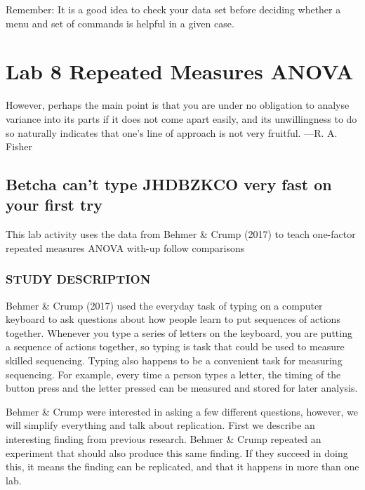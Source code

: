 \documentclass[
]{book}
\begin{document}
Remember: It is a good idea to check your data set before deciding whether a menu and set of commands is helpful in a given case.

\hypertarget{lab-8-repeated-measures-anova}{%
\chapter{Lab 8 Repeated Measures ANOVA}\label{lab-8-repeated-measures-anova}}

{
However, perhaps the main point is that you are under no obligation to analyse variance into its parts if it does not come apart easily, and its unwillingness to do so naturally indicates that one's line of approach is not very fruitful.
---R. A. Fisher
}

\hypertarget{betcha-cant-type-jhdbzkco-very-fast-on-your-first-try}{%
\section{Betcha can't type JHDBZKCO very fast on your first try}\label{betcha-cant-type-jhdbzkco-very-fast-on-your-first-try}}

This lab activity uses the data from Behmer \& Crump (2017) to teach one-factor repeated measures ANOVA with-up follow comparisons

\hypertarget{study-description-3}{%
\subsection{STUDY DESCRIPTION}\label{study-description-3}}

Behmer \& Crump (2017) used the everyday task of typing on a computer keyboard to ask questions about how people learn to put sequences of actions together. Whenever you type a series of letters on the keyboard, you are putting a sequence of actions together, so typing is task that could be used to measure skilled sequencing. Typing also happens to be a convenient task for measuring sequencing. For example, every time a person types a letter, the timing of the button press and the letter pressed can be measured and stored for later analysis.

Behmer \& Crump were interested in asking a few different questions, however, we will simplify everything and talk about replication. First we describe an interesting finding from previous research. Behmer \& Crump repeated an experiment that should also produce this same finding. If they succeed in doing this, it means the finding can be replicated, and that it happens in more than one lab.
\end{document}
